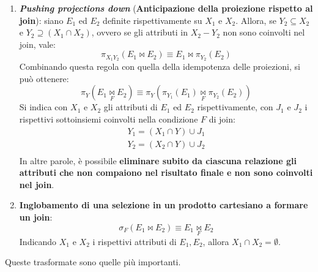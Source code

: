 \documentclass[a4paper]{article}
\begin{document}
\begin{enumerate}[label=\Roman*.]
		\item \textcolor{Red3}{\textbf{\emph{Pushing projections down}} (\textbf{Anticipazione della proiezione rispetto al join})}: siano $E_{1}$ ed $E_{2}$ definite rispettivamente su $X_{1}$ e $X_{2}$. Allora, se $Y_{2} \subseteq X_{2}$ e $Y_{2} \supseteq \left(X_{1} \cap X_{2}\right)$, ovvero se gli attributi in $X_{2} - Y_{2}$ non sono coinvolti nel join, vale:
		\begin{equation*}
			\pi_{X_{1}Y_{2}}\left(E_{1} \Join E_{2}\right) \equiv E_{1} \Join \pi_{Y_{2}}\left(E_{2}\right)
		\end{equation*}
		Combinando questa regola con quella della idempotenza delle proiezioni, si può ottenere:
		\begin{equation*}
			\pi_{Y}\left(E_{1} \underset{F}{\Join} E_{2}\right) \equiv \pi_{Y}\left(\pi_{Y_{1}}\left(E_{1}\right) \underset{F}{\Join} \pi_{Y_{2}}\left(E_{2}\right)\right)
		\end{equation*}
		Si indica con $X_{1}$ e $X_{2}$ gli attributi di $E_{1}$ ed $E_{2}$ rispettivamente, con $J_{1}$ e $J_{2}$ i rispettivi sottoinsiemi coinvolti nella condizione $F$ di join:
		\begin{gather*}
			Y_{1} = \left(X_{1} \cap Y\right) \cup J_{1} \\
			Y_{2} = \left(X_{2} \cap Y\right) \cup J_{2} \\
		\end{gather*}
		In altre parole, è possibile \textbf{eliminare subito da ciascuna relazione gli attributi che non compaiono nel risultato finale e non sono coinvolti nel join}.
	
		\item \textcolor{Red3}{\textbf{Inglobamento di una selezione in un prodotto cartesiano a formare un join}}:
		\begin{equation*}
			\sigma_{F}\left(E_{1} \Join E_{2}\right) \equiv E_{1} \underset{F}{\Join} E_{2}
		\end{equation*}
		Indicando $X_{1}$ e $X_{2}$ i rispettivi attributi di $E_{1}, E_{2}$, allora $X_{1} \cap X_{2} = \emptyset$.
	\end{enumerate}
	Queste trasformate sono quelle più importanti.\newline
	
\end{document}
